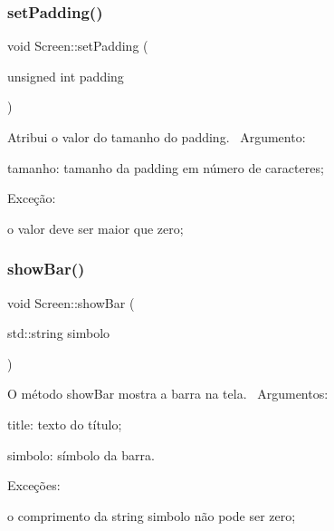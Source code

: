 \subsubsection{\texorpdfstring{set\+Padding()}{setPadding()}}
{\footnotesize\ttfamily void Screen\+::set\+Padding (\begin{DoxyParamCaption}\item[{unsigned int}]{padding }\end{DoxyParamCaption})}

Atribui o valor do tamanho do padding.~\newline
 Argumento\+:
\begin{DoxyItemize}
\item tamanho\+: tamanho da padding em número de caracteres;
\end{DoxyItemize}

Exceção\+:
\begin{DoxyItemize}
\item o valor deve ser maior que zero;
\end{DoxyItemize}\mbox{\label{classScreen_a16bd8465322e12b669e26ecccd4a3704}} 
\subsubsection{\texorpdfstring{show\+Bar()}{showBar()}}
{\footnotesize\ttfamily void Screen\+::show\+Bar (\begin{DoxyParamCaption}\item[{std\+::string}]{simbolo }\end{DoxyParamCaption})}

O método show\+Bar mostra a barra na tela.~\newline
Argumentos\+:
\begin{DoxyItemize}
\item title\+: texto do título;
\item simbolo\+: símbolo da barra.
\end{DoxyItemize}

Exceções\+:
\begin{DoxyItemize}
\item o comprimento da string simbolo não pode ser zero;
\end{DoxyItemize}\mbox{\label{classScreen_a7b425f6ea8830066c837f84e09f493a0}} 
